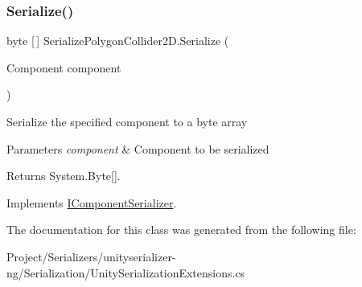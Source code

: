 \subsubsection{\texorpdfstring{Serialize()}{Serialize()}}
{\footnotesize\ttfamily byte \mbox{[}$\,$\mbox{]} Serialize\+Polygon\+Collider2\+D.\+Serialize (\begin{DoxyParamCaption}\item[{Component}]{component }\end{DoxyParamCaption})\hspace{0.3cm}{\ttfamily [inline]}}



Serialize the specified component to a byte array 


\begin{DoxyParams}{Parameters}
{\em component} & Component to be serialized\\
\hline
\end{DoxyParams}
\begin{DoxyReturn}{Returns}
System.\+Byte\mbox{[}\mbox{]}.
\end{DoxyReturn}


Implements \hyperlink{interface_i_component_serializer_ab2aa38005665496b62d6c54b5f0dbd31}{I\+Component\+Serializer}.



The documentation for this class was generated from the following file\+:\begin{DoxyCompactItemize}
\item 
Project/\+Serializers/unityserializer-\/ng/\+Serialization/Unity\+Serialization\+Extensions.\+cs\end{DoxyCompactItemize}
